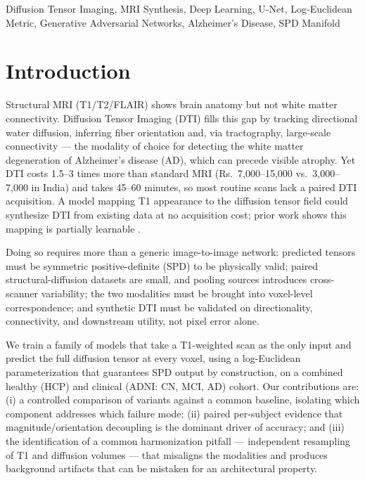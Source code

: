 \documentclass[conference,compsoc]{IEEEtran}
\begin{document}
\begin{IEEEkeywords}
Diffusion Tensor Imaging, MRI Synthesis, Deep Learning, U-Net, Log-Euclidean Metric, Generative Adversarial Networks, Alzheimer's Disease, SPD Manifold
\end{IEEEkeywords}

\section{Introduction}
\label{sec:introduction}
Structural MRI (T1/T2/FLAIR) shows brain anatomy but not white matter connectivity. Diffusion Tensor Imaging (DTI) fills this gap by tracking directional water diffusion, inferring fiber orientation and, via tractography, large-scale connectivity --- the modality of choice for detecting the white matter degeneration of Alzheimer's disease (AD), which can precede visible atrophy. Yet DTI costs 1.5--3 times more than standard MRI (Rs.~7,000--15,000 vs.\ 3,000--7,000 in India) and takes 45--60 minutes, so most routine scans lack a paired DTI acquisition. A model mapping T1 appearance to the diffusion tensor field could synthesize DTI from existing data at no acquisition cost; prior work shows this mapping is partially learnable \cite{paper1,paper2}.

Doing so requires more than a generic image-to-image network: predicted tensors must be symmetric positive-definite (SPD) to be physically valid; paired structural-diffusion datasets are small, and pooling sources introduces cross-scanner variability; the two modalities must be brought into voxel-level correspondence; and synthetic DTI must be validated on directionality, connectivity, and downstream utility, not pixel error alone.

We train a family of models that take a T1-weighted scan as the only input and predict the full diffusion tensor at every voxel, using a log-Euclidean parameterization that guarantees SPD output by construction, on a combined healthy (HCP) and clinical (ADNI: CN, MCI, AD) cohort. Our contributions are: (i) a controlled comparison of variants against a common baseline, isolating which component addresses which failure mode; (ii) paired per-subject evidence that magnitude/orientation decoupling is the dominant driver of accuracy; and (iii) the identification of a common harmonization pitfall --- independent resampling of T1 and diffusion volumes --- that misaligns the modalities and produces background artifacts that can be mistaken for an architectural property.
\end{document}
